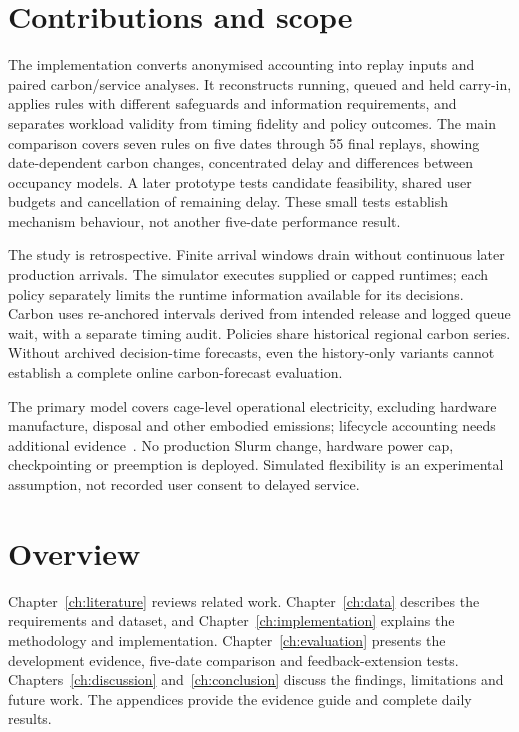 \section{Contributions and scope}
The implementation converts anonymised accounting into replay inputs and paired carbon/service analyses. It reconstructs running, queued and held carry-in, applies rules with different safeguards and information requirements, and separates workload validity from timing fidelity and policy outcomes. The main comparison covers seven rules on five dates through 55 final replays, showing date-dependent carbon changes, concentrated delay and differences between occupancy models. A later prototype tests candidate feasibility, shared user budgets and cancellation of remaining delay. These small tests establish mechanism behaviour, not another five-date performance result.

The study is retrospective. Finite arrival windows drain without continuous later production arrivals. The simulator executes supplied or capped runtimes; each policy separately limits the runtime information available for its decisions. Carbon uses re-anchored intervals derived from intended release and logged queue wait, with a separate timing audit. Policies share historical regional carbon series. Without archived decision-time forecasts, even the history-only variants cannot establish a complete online carbon-forecast evaluation.

The primary model covers cage-level operational electricity, excluding hardware manufacture, disposal and other embodied emissions; lifecycle accounting needs additional evidence~\cite{gupta2022act}. No production Slurm change, hardware power cap, checkpointing or preemption is deployed. Simulated flexibility is an experimental assumption, not recorded user consent to delayed service.

\section{Overview}
Chapter~\ref{ch:literature} reviews related work. Chapter~\ref{ch:data} describes the requirements and dataset, and Chapter~\ref{ch:implementation} explains the methodology and implementation. Chapter~\ref{ch:evaluation} presents the development evidence, five-date comparison and feedback-extension tests. Chapters~\ref{ch:discussion} and~\ref{ch:conclusion} discuss the findings, limitations and future work. The appendices provide the evidence guide and complete daily results.
